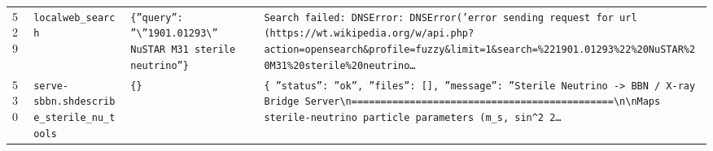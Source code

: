 \documentclass[11pt,a4paper]{article}
\begin{document}
\begin{longtable}{@{}p{}p{}p{}p{}@{}}
529 & \texttt{local}\newline\texttt{web\_\allowbreak{}search} & \texttt{\{''query'':\allowbreak{} ''\textbackslash{}\allowbreak{}''1901.01293\textbackslash{}\allowbreak{}'' NuSTAR M31 sterile neutrino''\}\allowbreak{}} & \texttt{Search failed:\allowbreak{} DNSError:\allowbreak{} DNSError('error sending request for url (https:\allowbreak{}/\allowbreak{}/\allowbreak{}wt.wikipedia.org/\allowbreak{}w/\allowbreak{}api.php?action=\allowbreak{}opensearch\&profile=\allowbreak{}fuzzy\&limit=\allowbreak{}1\&search=\allowbreak{}\%221901.01293\%22\%20NuSTAR\%20M31\%20sterile\%20neutrino\ldots{}\allowbreak{}} \\
530 & \texttt{serve-sbbn.sh}\newline\texttt{describe\_\allowbreak{}sterile\_\allowbreak{}nu\_\allowbreak{}tools} & \texttt{\{\}\allowbreak{}} & \texttt{\{   ''status'':\allowbreak{} ''ok'',\allowbreak{}   ''files'':\allowbreak{} []\allowbreak{},\allowbreak{}   ''message'':\allowbreak{} ''Sterile Neutrino -\textgreater{}\allowbreak{} BBN /\allowbreak{} X-ray Bridge Server\textbackslash{}\allowbreak{}n=\allowbreak{}=\allowbreak{}=\allowbreak{}=\allowbreak{}=\allowbreak{}=\allowbreak{}=\allowbreak{}=\allowbreak{}=\allowbreak{}=\allowbreak{}=\allowbreak{}=\allowbreak{}=\allowbreak{}=\allowbreak{}=\allowbreak{}=\allowbreak{}=\allowbreak{}=\allowbreak{}=\allowbreak{}=\allowbreak{}=\allowbreak{}=\allowbreak{}=\allowbreak{}=\allowbreak{}=\allowbreak{}=\allowbreak{}=\allowbreak{}=\allowbreak{}=\allowbreak{}=\allowbreak{}=\allowbreak{}=\allowbreak{}=\allowbreak{}=\allowbreak{}=\allowbreak{}=\allowbreak{}=\allowbreak{}=\allowbreak{}=\allowbreak{}=\allowbreak{}=\allowbreak{}=\allowbreak{}=\allowbreak{}=\allowbreak{}=\allowbreak{}\textbackslash{}\allowbreak{}n\textbackslash{}\allowbreak{}nMaps sterile-neutrino particle parameters (m\_\allowbreak{}s,\allowbreak{} sin\textasciicircum{}\allowbreak{}2 2\ldots{}\allowbreak{}} \\

\end{longtable}
\end{document}
